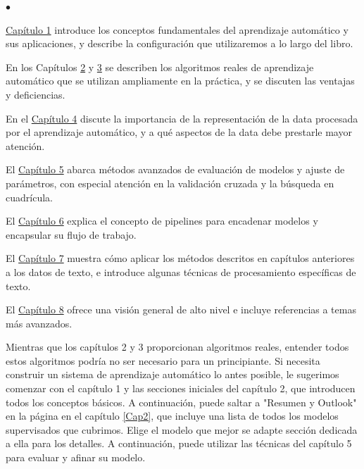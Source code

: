\begin{list}{$\bullet$}{}  
	
	\item  \hyperlink{Cap1}{\color{vino} Capítulo 1} introduce los conceptos fundamentales del aprendizaje automático y sus aplicaciones, y describe la configuración que utilizaremos a lo largo del libro. 
	
	\item En los Capítulos  \hyperlink{Cap2}{\color{vino}2} y \hyperlink{Cap2}{\color{vino}3} se describen los algoritmos reales de aprendizaje automático que se utilizan   ampliamente en la práctica, y se discuten las  ventajas y deficiencias. 
	
	\item En el \hyperlink{Cap4}{\color{vino}Capítulo 4}   discute la importancia de la representación de la data  procesada por  el aprendizaje automático, y a qué aspectos de la data debe prestarle mayor  atención.
	
	\item  El \hyperlink{Cap5}{\color{vino}Capítulo 5}  abarca métodos avanzados de evaluación de modelos y ajuste de parámetros, con especial atención en la validación cruzada y la búsqueda en cuadrícula.
	
	\item  El \hyperlink{Cap6}{\color{vino}Capítulo 6} explica el concepto de {\ttfamily pipelines} para encadenar modelos y encapsular su flujo de trabajo. 
	
	\item  El \hyperlink{Cap7}{\color{vino}Capítulo 7} muestra cómo aplicar los métodos descritos en capítulos anteriores a los datos de texto, e introduce algunas técnicas de procesamiento específicas de texto. 
	
	\item  El \hyperlink{Cap8}{\color{vino}Capítulo 8}  ofrece una visión general de alto nivel e incluye referencias a temas más avanzados.
	
\end{list}


Mientras que los capítulos 2 y 3 proporcionan  algoritmos reales, entender todos estos algoritmos podría no ser necesario para un principiante. Si necesita construir un sistema de aprendizaje automático lo antes posible, le sugerimos comenzar con el capítulo 1 y las secciones iniciales del capítulo 2, que introducen todos los conceptos básicos. A continuación, puede saltar a "{}Resumen y Outlook"{} en la página \pageref{Pagina127} en el capítulo \ref{Cap2}, que incluye una lista de todos los modelos supervisados que cubrimos. Elige el modelo que mejor se adapte sección dedicada a ella para los detalles. A continuación, puede utilizar las técnicas del capítulo 5 para evaluar y afinar su modelo.


